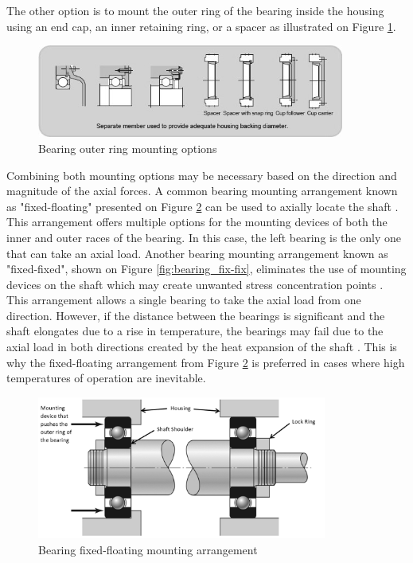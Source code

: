 The other option is to mount the outer ring of the bearing inside the housing using an end cap, an inner retaining ring, or a spacer as illustrated on Figure \ref{fig:bearing_outer}.

\begin{figure}[H]
    \centering
    \includegraphics[width=0.9\textwidth]{Sections/LiteratureReview/img/Bearings/Bearings_outer_set.jpg}
    \caption{Bearing outer ring mounting options \cite{hch_bearing_mounting_2013}}
    \label{fig:bearing_outer}
\end{figure}

Combining both mounting options may be necessary based on the direction and magnitude of the axial forces. A common bearing mounting arrangement known as "fixed-floating" presented on Figure \ref{fig:bearing_fix-float} can be used to axially locate the shaft \cite{budynas_shigleys_2015}. This arrangement offers multiple options for the mounting devices of both the inner and outer races of the bearing. In this case, the left bearing is the only one that can take an axial load. Another bearing mounting arrangement known as "fixed-fixed", shown on Figure \ref{fig:bearing_fix-fix}, eliminates the use of mounting devices on the shaft which may create unwanted stress concentration points \cite{budynas_shigleys_2015}. This arrangement allows a single bearing to take the axial load from one direction. However, if the distance between the bearings is significant and the shaft elongates due to a rise in temperature, the bearings may fail due to the axial load in both directions created by the heat expansion of the shaft \cite{budynas_shigleys_2015}. This is why the fixed-floating arrangement from Figure \ref{fig:bearing_fix-float} is preferred in cases where high temperatures of operation are inevitable.

\begin{figure}[H]
    \centering
    \includegraphics[width=0.85\textwidth]{Sections/LiteratureReview/img/Bearings/bearings_fix_float.png}
    \caption{Bearing fixed-floating mounting arrangement \cite{budynas_shigleys_2015}}
    \label{fig:bearing_fix-float}
\end{figure}

